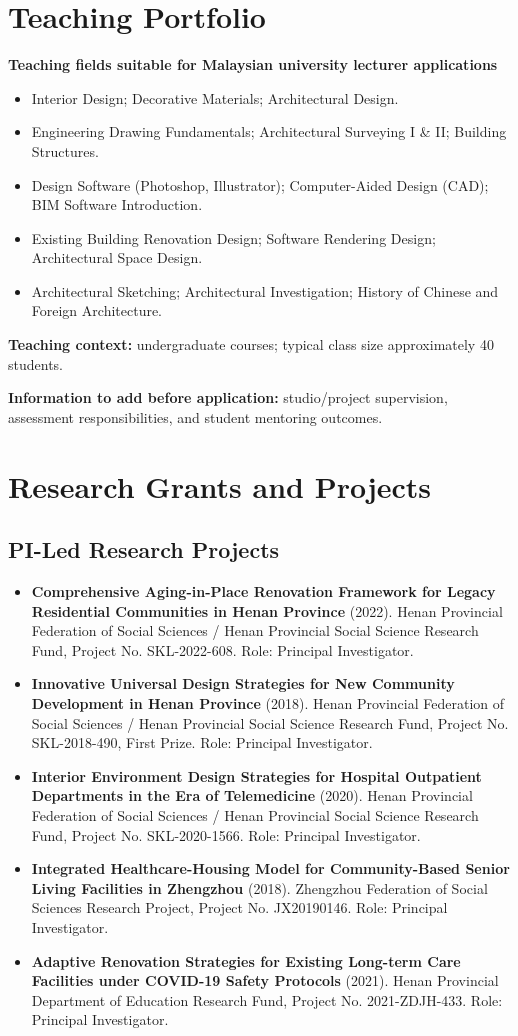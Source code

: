 \documentclass[11pt,a4paper]{article}
\newcommand{\project}[4]{%
  \item \textbf{#1} (#2). #3. #4%
}
\begin{document}
\section*{Teaching Portfolio}
\textbf{Teaching fields suitable for Malaysian university lecturer applications}
\begin{itemize}
  \item Interior Design; Decorative Materials; Architectural Design.
  \item Engineering Drawing Fundamentals; Architectural Surveying I \& II; Building Structures.
  \item Design Software (Photoshop, Illustrator); Computer-Aided Design (CAD); BIM Software Introduction.
  \item Existing Building Renovation Design; Software Rendering Design; Architectural Space Design.
  \item Architectural Sketching; Architectural Investigation; History of Chinese and Foreign Architecture.
\end{itemize}

\textbf{Teaching context:} undergraduate courses; typical class size approximately 40 students.

\textbf{Information to add before application:} studio/project supervision, assessment responsibilities, and student mentoring outcomes.

\section*{Research Grants and Projects}
\subsection*{PI-Led Research Projects}
\begin{itemize}
  \project{Comprehensive Aging-in-Place Renovation Framework for Legacy Residential Communities in Henan Province}{2022}{Henan Provincial Federation of Social Sciences / Henan Provincial Social Science Research Fund, Project No. SKL-2022-608}{Role: Principal Investigator.}
  \project{Innovative Universal Design Strategies for New Community Development in Henan Province}{2018}{Henan Provincial Federation of Social Sciences / Henan Provincial Social Science Research Fund, Project No. SKL-2018-490, First Prize}{Role: Principal Investigator.}
  \project{Interior Environment Design Strategies for Hospital Outpatient Departments in the Era of Telemedicine}{2020}{Henan Provincial Federation of Social Sciences / Henan Provincial Social Science Research Fund, Project No. SKL-2020-1566}{Role: Principal Investigator.}
  \project{Integrated Healthcare-Housing Model for Community-Based Senior Living Facilities in Zhengzhou}{2018}{Zhengzhou Federation of Social Sciences Research Project, Project No. JX20190146}{Role: Principal Investigator.}
  \project{Adaptive Renovation Strategies for Existing Long-term Care Facilities under COVID-19 Safety Protocols}{2021}{Henan Provincial Department of Education Research Fund, Project No. 2021-ZDJH-433}{Role: Principal Investigator.}
\end{itemize}
\end{document}
